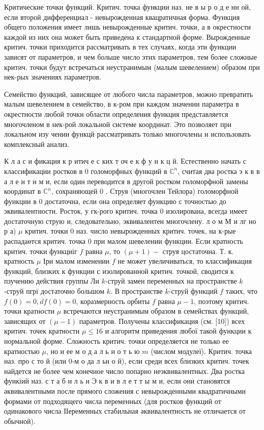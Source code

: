 \documentclass[10pt]{article}
\begin{document}
Критические точки функций. Критич. точка функции наз. не в ы р о д е нн ой, если второй дифференциал - невырожденная квацратичная форма. Функция общего положения имеет лишь невырожденные критич. точки, а в окрестности каждой из них она может быть приведена к стандартной форме. Вырожденные критич. точки приходится рассматривать в тех случаях, когда эти функции зависят от параметров, и чем больше число этих параметров, тем более сложные критич. точки будут встречаться неустранимым (малым шевелением) образом при нек-рых значениях параметров.



Семейство функций, зависящее от любого числа параметров, можно превратить малым шевелением в семейство, в к-ром при каждом значении параметра в окрестности любой точки области определения функция представляется многочленом в нек-рой локальной системе координат. Это позволяет при локальном изу чении функцй рассматривать только многочлены и использовать комплексный анализ.



К л а с и фикация к р итич е с ких т оч е к ф у н к ц й. Естественно начать с классификации ростков в 0 голоморфных функций в $\mathbb{C}^{n}$, считая два ростка э к в в а л е н т н м и, если один переводится в другой ростком голоморфной замены координат в $\mathbb{C}^{n}$, сохраняющей 0 . Струя (многочлен Тейлора) голоморфной функции в 0 достаточна, если она определяет функцию с точностью до эквивалентности. Росток, у гк-рого критич. точка 0 изолирована, всегда имеет достаточную струю и, следовательно, эквивалентен многочлену. л о м М и лг но р а) $\mu$ критич. точки 0 наз. число невырожденных критич. точек, на к-рые распадаөтся критич. точка 0 при малом шевелении функции. Если кратность критич. точки функциіг $f$ равна $\mu$, то $(\mu+1)-$ струя цостаточна. Т. к. кратность $\mu$ Іри малом изменении $f$ не может увеличиваться, то классификация функций, близких к функции с изолированной критич. точкой, сводится к пзучению действия группы Ли $k$-струй замен переменных на пространстве $k$-струй пгрі достаточно большом $k$. В пространстве $k$-струй функций $f$ таких, что $f(0)=0, d f(0)=0$, коразмерность орбиты $f$ равна $\mu-1$, поэтому критич. точки кратности $\mu$ встречаются неустранимым образом в семействах функций, зависящих от $(\mu-1)$ параметров. Получены классификация (см. [10]) всех критич. точек кратности $\mu \leqslant 16$ и алгоритм приведения любої такой функции к нормальной форме. Сложность критич. точки определяется не только ее кратностью $\mu$, но и ее м о д а л ь н о т ь ю $m$ (числом модулеї). Критич. точка наз. про с то й (или 0-м о да л ьн о й), если среди всех близких критич. точек найдется не более чем конечное число попарно неэквивалентных. Два ростка функіий наз. с т а б и л ь н Э к в и в л е т т ы м и, если они становятся әквивалентными после прямого сложения с невырожденными квадратичными формами от подходящего числа переменных (для ростков функций от одинакового числа ІІеременных стабильная әквивалентность не отличается от обычной).
\end{document}
